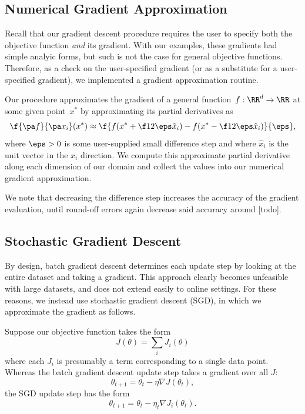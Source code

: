 \documentclass{amsart}
\begin{document}
\subsection{Numerical Gradient Approximation}

Recall that our gradient descent procedure requires the user to specify both the objective function \emph{and} its gradient. With our examples, these gradients had simple analyic forms, but such is not the case for general objective functions. Therefore, as a check on the user-specified gradient (or as a substitute for a user-specified gradient), we implemented a gradient approximation routine.

Our procedure approximates the gradient of a general function~$f:\RR^d\to\RR$ at some given point~$x^*$ by approximating its partial derivatives as
\begin{equation}
\f{\pa f}{\pa x_i}(x^*) \approx \f{f(x^* + \f12\eps\hat x_i) - f(x^* - \f12 \eps\hat x_i)}{\eps},
\end{equation}
where $\eps > 0$ is some user-supplied small difference step and where $\hat x_i$ is the unit vector in the $x_i$ direction. We compute this approximate partial derivative along each dimension of our domain and collect the values into our numerical gradient approximation. 


We note that decreasing the difference step increases the accuracy of the gradient evaluation, until round-off errors again decrease said accuracy around [todo].

\subsection{Stochastic Gradient Descent}

By design, batch gradient descent determines each update step by looking at the entire dataset and taking a gradient. This approach clearly becomes unfeasible with large datasets, and does not extend easily to online settings. For these reasons, we instead use stochastic gradient descent (SGD), in which we approximate the gradient as follows.

Suppose our objective function takes the form
\begin{equation}
J(\theta) = \sum_i J_i(\theta)
\end{equation}
where each $J_i$ is presumably a term corresponding to a single data point. Whereas the batch gradient descent update step takes a gradient over all $J$:
\begin{equation}
\theta_{t+1} = \theta_t - \eta \nabla J(\theta_t),
\end{equation}
the SGD update step has the form
\begin{equation} \theta_{t+1} = \theta_t - \eta_t \nabla J_i(\theta_t). \end{equation}
\end{document}
